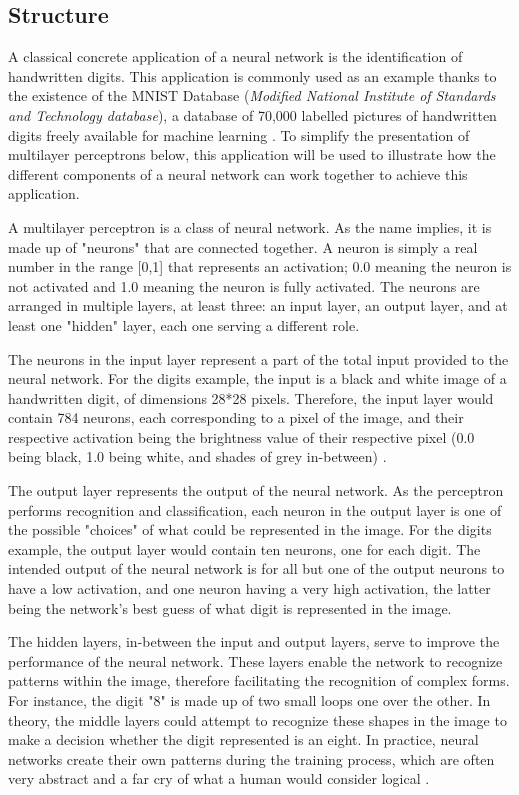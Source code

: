 \documentclass[12pt,a4paper,notitlepage]{article}
\begin{document}
\subsection{Structure}
A classical concrete application of a neural network is the identification of handwritten digits. This application is commonly used as an example thanks to the existence of the MNIST Database (\textit{Modified National Institute of Standards and Technology database}), a database of 70,000 labelled pictures of handwritten digits freely available for machine learning \cite{lecun_mnist_1998}. To simplify the presentation of multilayer perceptrons below, this application will be used to illustrate how the different components of a neural network can work together to achieve this application.

A multilayer perceptron is a class of neural network. As the name implies, it is made up of "neurons" that are connected together. A neuron is simply a real number in the range [0,1] that represents an activation; 0.0 meaning the neuron is not activated and 1.0 meaning the neuron is fully activated. The neurons are arranged in multiple layers, at least three: an input layer, an output layer, and at least one "hidden" layer, each one serving a different role.

The neurons in the input layer represent a part of the total input provided to the neural network. For the digits example, the input is a black and white image of a handwritten digit, of dimensions 28*28 pixels. Therefore, the input layer would contain 784 neurons, each corresponding to a pixel of the image, and their respective activation being the brightness value of their respective pixel (0.0 being black, 1.0 being white, and shades of grey in-between) \cite{sanderson_but_2017}.

The output layer represents the output of the neural network. As the perceptron performs recognition and classification, each neuron in the output layer is one of the possible "choices" of what could be represented in the image. For the digits example, the output layer would contain ten neurons, one for each digit. The intended output of the neural network is for all but one of the output neurons to have a low activation, and one neuron having a very high activation, the latter being the network's best guess of what digit is represented in the image.

The hidden layers, in-between the input and output layers, serve to improve the performance of the neural network. These layers enable the network to recognize patterns within the image, therefore facilitating the recognition of complex forms. For instance, the digit "8" is made up of two small loops one over the other. In theory, the middle layers could attempt to recognize these shapes in the image to make a decision whether the digit represented is an eight. In practice, neural networks create their own patterns during the training process, which are often very abstract and a far cry of what a human would consider logical \cite{sanderson_gradient_2017}.
\end{document}
